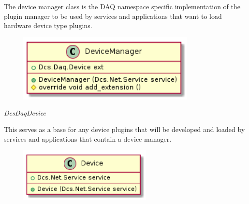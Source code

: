       \vspace*{-0.75cm}
      \begin{minipage}[t]{0.5\textwidth}
      	\vspace*{0.5cm}
        The device manager class is the DAQ namespace specific implementation of
        the plugin manager to be used by services and applications that want to
        load hardware device type plugins.
      \end{minipage} \hfill
      \begin{minipage}[t]{0.45\textwidth}
        \begin{figure}[H]
          \includegraphics[width=0.8\textwidth]{figures/design/class/daq/device-manager}
          \label{fig:dsg-classes-daq-device-manager}
        \end{figure}
      \end{minipage}

      \emph{DcsDaqDevice}

      \vspace*{-0.75cm}
      \begin{minipage}[t]{0.5\textwidth}
      	\vspace*{0.5cm}
        This serves as a base for any device plugins that will be developed and
        loaded by services and applications that contain a device manager.
      \end{minipage} \hfill
      \begin{minipage}[t]{0.45\textwidth}
        \begin{figure}[H]
          \includegraphics[width=0.6\textwidth]{figures/design/class/daq/device}
          \label{fig:dsg-classes-daq-device}
        \end{figure}
      \end{minipage}

